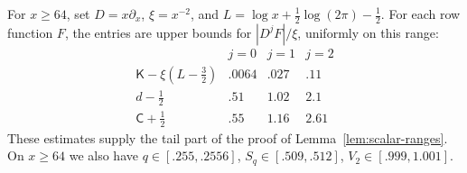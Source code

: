 \begin{lemma}\label{lem:scalar-tail}
For \(x\ge64\), set \(D=x\partial_x\), \(\xi=x^{-2}\),
and \(L=\log x+\frac12\log(2\pi)-\frac12\).
For each row function \(F\), the entries are upper bounds for
\(|D^jF|/\xi\), uniformly on this range:
\[
\begin{array}{c|ccc}
 &j=0&j=1&j=2\\\hline
 \mathsf K-\xi(L-\tfrac32)&.0064&.027&.11\\
 d-\tfrac12&.51&1.02&2.1\\
 \mathsf C+\tfrac12&.55&1.16&2.61
\end{array}
\]
These estimates supply the tail part of the proof of
Lemma~\ref{lem:scalar-ranges}. On \(x\ge64\) we also have
\(q\in[.255,.2556]\), \(S_q\in[.509,.512]\),
\(V_2\in[.999,1.001]\).
\end{lemma}

